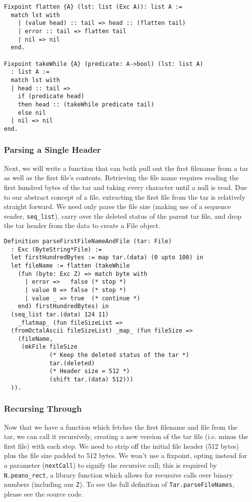 \documentclass[nocopyrightspace]{sigplanconf}
\begin{document}
\begin{lstlisting}
Fixpoint flatten {A} (lst: list (Exc A)): list A :=
  match lst with
    | (value head) :: tail => head :: (flatten tail)
    | error :: tail => flatten tail
    | nil => nil
  end.

Fixpoint takeWhile {A} (predicate: A->bool) (lst: list A)
  : list A :=
  match lst with
  | head :: tail => 
    if (predicate head) 
    then head :: (takeWhile predicate tail)
    else nil
  | nil => nil
end.
\end{lstlisting}

\subsubsection{Parsing a Single Header}
Next, we will write a function that can both pull out the first filename from
a tar as well as the first file's contents. Retrieving the file name requires
reading the first hundred bytes of the tar and taking every character until a
null is read. Due to our abstract concept of a file, extracting the first file
from the tar is relatively straight forward. We need only parse the file size
(making use of a sequence reader, {\tt seq\_list}), carry over the deleted
status of the parent tar file, and drop the tar header from the data to create
a File object.

\begin{lstlisting}
Definition parseFirstFileNameAndFile (tar: File)
  : Exc (ByteString*File) :=
  let firstHundredBytes := map tar.(data) (0 upto 100) in
  let fileName := flatten (takeWhile 
    (fun (byte: Exc Z) => match byte with
      | error =>   false (* stop *)
      | value 0 => false (* stop *)
      | value _ => true  (* continue *)
    end) firstHundredBytes) in
  (seq_list tar.(data) 124 11) 
    _flatmap_ (fun fileSizeList =>
  (fromOctalAscii fileSizeList) _map_ (fun fileSize =>
    (fileName, 
     (mkFile fileSize
             (* Keep the deleted status of the tar *)
             tar.(deleted)  
             (* Header size = 512 *)
             (shift tar.(data) 512)))
  )).
\end{lstlisting}

\subsubsection{Recursing Through}
Now that we have a function which fetches the first filename and file from the
tar, we can call it recursively, creating a new version of the tar file (i.e.
minus the first file) with each step. We need to strip off the initial file
header (512 bytes) plus the file size padded to 512 bytes. We won't use a
fixpoint, opting instead for a parameter ({\tt nextCall}) to signify the
recursive call; this is required by {\tt N.peano\_rect}, a library function
which allows for recursive calls over binary numbers (including our {\tt Z}).
To see the full definition of {\tt Tar.parseFileNames}, please see the source
code.
\end{document}
